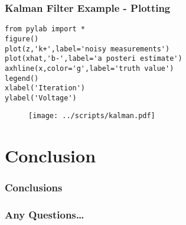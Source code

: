 \documentclass{beamer}
\begin{document}
	
\begin{frame}[fragile]
\tiny
\frametitle{Kalman Filter Example - Plotting}
\begin{lstlisting}
from pylab import *
figure()
plot(z,'k+',label='noisy measurements')
plot(xhat,'b-',label='a posteri estimate')
axhline(x,color='g',label='truth value')
legend()
xlabel('Iteration')
ylabel('Voltage')
\end{lstlisting}

\begin{figure}
	\texttt{[image: ../scripts/kalman.pdf]}
\end{figure}

\end{frame}



\section{Conclusion}
\begin{frame}
	\frametitle{Conclusions}

\end{frame}


\begin{frame}
	\frametitle{Any Questions\ldots}

\end{frame}
\end{document}

